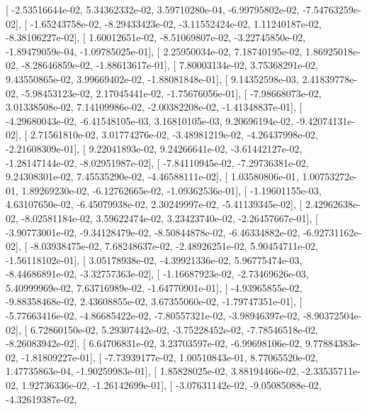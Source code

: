 \documentclass{article}
\begin{document}
       [ -2.53516644e-02,   5.34362332e-02,   3.59710280e-04,
         -6.99795802e-02,  -7.54763259e-02],
       [ -1.65243758e-02,  -8.29433423e-02,  -3.11552424e-02,
          1.11240187e-02,  -8.38106227e-02],
       [  1.60012651e-02,  -8.51069807e-02,  -3.22745850e-02,
         -1.89479059e-04,  -1.09785025e-01],
       [  2.25950034e-02,   7.18740195e-02,   1.86925018e-02,
         -8.28646859e-02,  -1.88613617e-01],
       [  7.80003134e-02,   3.75368291e-02,   9.43550865e-02,
          3.99669402e-02,  -1.88081848e-01],
       [  9.14352598e-03,   2.41839778e-02,  -5.98453123e-02,
          2.17045441e-02,  -1.75676056e-01],
       [ -7.98668073e-02,   3.01338508e-02,   7.14109986e-02,
         -2.00382208e-02,  -1.41348837e-01],
       [ -4.29680043e-02,  -6.41548105e-03,   3.16810105e-03,
          9.20696194e-02,  -9.42074131e-02],
       [  2.71561810e-02,   3.01774276e-02,  -3.48981219e-02,
         -4.26437998e-02,  -2.21608309e-01],
       [  9.22041893e-02,   9.24266641e-02,  -3.61442127e-02,
         -1.28147144e-02,  -8.02951987e-02],
       [ -7.84110945e-02,  -7.29736381e-02,   9.24308301e-02,
          7.45535290e-02,  -4.46588111e-02],
       [  1.03580806e-01,   1.00753272e-01,   1.89269230e-02,
         -6.12762665e-02,  -1.09362536e-01],
       [ -1.19601155e-03,   4.63107650e-02,  -6.45079938e-02,
          2.30249997e-02,  -5.41139345e-02],
       [  2.42962638e-02,  -8.02581184e-02,   3.59622474e-02,
          3.23423740e-02,  -2.26457667e-01],
       [ -3.90773001e-02,  -9.34128479e-02,  -8.50844878e-02,
         -6.46334882e-02,  -6.92731162e-02],
       [ -8.03938475e-02,   7.68248637e-02,  -2.48926251e-02,
          5.90454711e-02,  -1.56118102e-01],
       [  3.05178938e-02,  -4.39921336e-02,   5.96775474e-03,
         -8.44686891e-02,  -3.32757363e-02],
       [ -1.16687923e-02,  -2.73469626e-03,   5.40999969e-02,
          7.63716989e-02,  -1.64770901e-01],
       [ -4.93965855e-02,  -9.88358468e-02,   2.43608855e-02,
          3.67355060e-02,  -1.79747351e-01],
       [ -5.77663416e-02,  -4.86685422e-02,  -7.80557321e-02,
         -3.98946397e-02,  -8.90372504e-02],
       [  6.72860150e-02,   5.29307442e-02,  -3.75228452e-02,
         -7.78546518e-02,  -8.26083942e-02],
       [  6.64706831e-02,   3.23703597e-02,  -6.99698106e-02,
          9.77884383e-02,  -1.81809227e-01],
       [ -7.73939177e-02,   1.00510843e-01,   8.77065520e-02,
          1.47735863e-04,  -1.90259983e-01],
       [  1.85828025e-02,   3.88194466e-02,  -2.33535711e-02,
          1.92736336e-02,  -1.26142699e-01],
       [ -3.07631142e-02,  -9.05085088e-02,  -4.32619387e-02,
\end{document}
